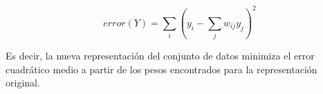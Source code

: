 \begin{equation}
    error(Y) = \sum_i \left( y_i - \sum_j {w_{ij}y_j} \right)^2
\end{equation}

Es decir, la nueva representación del conjunto de datos minimiza el error cuadrático medio a partir de los pesos encontrados para la representación original.

%
%
